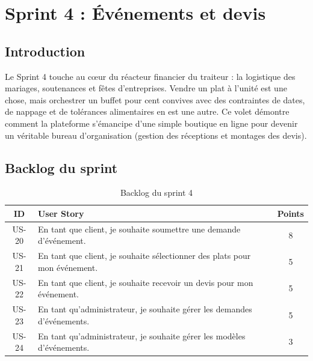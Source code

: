 \chapter{Sprint 4 : Événements et devis}

\section{Introduction}

Le Sprint 4 touche au cœur du réacteur financier du traiteur : la logistique des mariages, soutenances et fêtes d'entreprises. Vendre un plat à l'unité est une chose, mais orchestrer un buffet pour cent convives avec des contraintes de dates, de nappage et de tolérances alimentaires en est une autre. Ce volet démontre comment la plateforme s'émancipe d'une simple boutique en ligne pour devenir un véritable bureau d'organisation (gestion des réceptions et montages des devis).

\section{Backlog du sprint}

\begin{table}[H]
    \centering
    \caption{Backlog du sprint 4}
    \label{tab:backlog_sprint4}
    \renewcommand{\arraystretch}{1.3}
    \begin{tabular}{|c|p{8cm}|c|}
        \hline
        \textbf{ID} & \textbf{User Story} & \textbf{Points} \\
        \hline
        US-20 & En tant que client, je souhaite soumettre une demande d'événement. & 8 \\
        \hline
        US-21 & En tant que client, je souhaite sélectionner des plats pour mon événement. & 5 \\
        \hline
        US-22 & En tant que client, je souhaite recevoir un devis pour mon événement. & 5 \\
        \hline
        US-23 & En tant qu'administrateur, je souhaite gérer les demandes d'événements. & 5 \\
        \hline
        US-24 & En tant qu'administrateur, je souhaite gérer les modèles d'événements. & 3 \\
        \hline
    \end{tabular}
\end{table}

